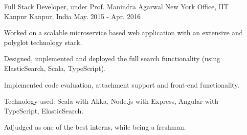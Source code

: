 \begin{cventries}
  \cventry
  {Full Stack Developer, under Prof. Manindra Agarwal}
  {New York Office, IIT Kanpur}
  {Kanpur, India}
  {May. 2015 - Apr. 2016}
  {
    \begin{cvitems}
    \item Worked on a scalable microservice based web application with an extensive and polyglot technology stack.
    \item Designed, implemented and deployed the full search functionality
      (using ElasticSearch, Scala, TypeScript).
    \item Implemented code evaluation, attachment support and
      front-end functionality.
    \item Technology used: Scala with Akka, Node.js with Express,
      Angular with TypeScript, ElasticSearch.
    \item Adjudged as one of the best interns, while being a freshman.
    \end{cvitems}
  }

\end{cventries}

